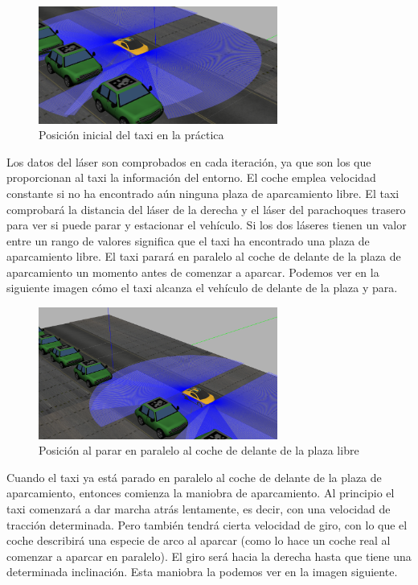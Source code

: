 \begin{figure}[H]
  \begin{center}
    \includegraphics[width=0.7\textwidth]{figures/Autopark/Posicion1.png}
		\caption{Posición inicial del taxi en la práctica}
		\label{fig.Posicion1}
		\end{center}
\end{figure}

Los datos del láser son comprobados en cada iteración, ya que son los que proporcionan al taxi la información del entorno. El coche emplea velocidad constante si no ha encontrado aún ninguna plaza de aparcamiento libre. El taxi comprobará la distancia del láser de la derecha y el láser del parachoques trasero para ver si puede parar y estacionar el vehículo. Si los dos láseres tienen un valor entre un rango de valores significa que el taxi ha encontrado una plaza de aparcamiento libre. El taxi parará en paralelo al coche de delante de la plaza de aparcamiento un momento antes de comenzar a aparcar. Podemos ver en la siguiente imagen cómo el taxi alcanza el vehículo de delante de la plaza y para.

\begin{figure}[H]
  \begin{center}
    \includegraphics[width=0.7\textwidth]{figures/Autopark/Posicion2.png}
		\caption{Posición al parar en paralelo al coche de delante de la plaza libre}
		\label{fig.Posicion2}
		\end{center}
\end{figure}

Cuando el taxi ya está parado en paralelo al coche de delante de la plaza de aparcamiento, entonces comienza la maniobra de aparcamiento. Al principio el taxi comenzará a dar marcha atrás lentamente, es decir, con una velocidad de tracción determinada. Pero también tendrá cierta velocidad de giro, con lo que el coche describirá una especie de arco al aparcar (como lo hace un coche real al comenzar a aparcar en paralelo). El giro será hacia la derecha hasta que tiene una determinada inclinación. Esta maniobra la podemos ver en la imagen siguiente.

